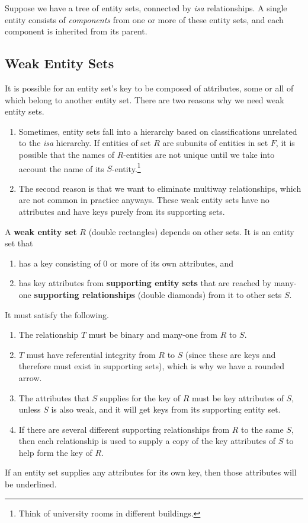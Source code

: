   Suppose we have a tree of entity sets, connected by \textit{isa} relationships. A single entity consists of \textit{components} from one or more of these entity sets, and each component is inherited from its parent. 

\subsection{Weak Entity Sets}

  It is possible for an entity set's key to be composed of attributes, some or all of which belong to another entity set. There are two reasons why we need weak entity sets. 
  \begin{enumerate}
    \item Sometimes, entity sets fall into a hierarchy based on classifications unrelated to the \textit{isa} hierarchy. If entities of set $R$ are subunits of entities in set $F$, it is possible that the names of $R$-entities are not unique until we take into account the name of its $S$-entity.\footnote{Think of university rooms in different buildings.}
    \item The second reason is that we want to eliminate multiway relationships, which are not common in practice anyways. These weak entity sets have no attributes and have keys purely from its supporting sets. 
  \end{enumerate}

  \begin{definition}
    A \textbf{weak entity set} $R$ (double rectangles) depends on other sets. It is an entity set that 
    \begin{enumerate}
      \item has a key consisting of 0 or more of its own attributes, and 
      \item has key attributes from \textbf{supporting entity sets} that are reached by many-one \textbf{supporting relationships} (double diamonds) from it to other sets $S$. 
    \end{enumerate}
    It must satisfy the following. 
    \begin{enumerate}
      \item The relationship $T$ must be binary and many-one from $R$ to $S$. 
      \item $T$ must have referential integrity from $R$ to $S$ (since these are keys and therefore must exist in supporting sets), which is why we have a rounded arrow. 
      \item The attributes that $S$ supplies for the key of $R$ must be key attributes of $S$, unless $S$ is also weak, and it will get keys from its supporting entity set. 
      \item If there are several different supporting relationships from $R$ to the same $S$, then each relationship is used to supply a copy of the key attributes of $S$ to help form the key of $R$. 
    \end{enumerate}
    If an entity set supplies any attributes for its own key, then those attributes will be underlined. 
  \end{definition}


